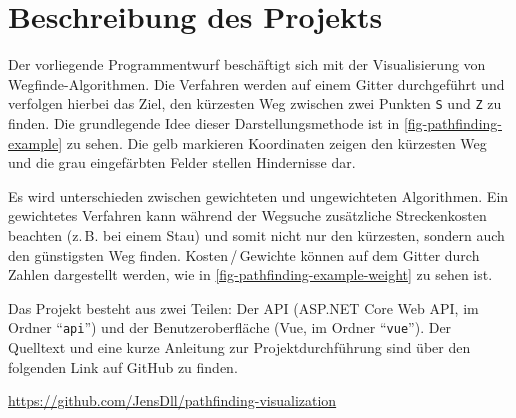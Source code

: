 \part{Beschreibung des Projekts}
Der vorliegende Programmentwurf beschäftigt sich mit der
Visualisierung von Wegfinde-Algo\-rithmen.
Die Verfahren werden auf einem Gitter durchgeführt und
verfolgen hierbei das Ziel, den kürzesten Weg zwischen zwei Punkten
\texttt{S} und \texttt{Z} zu finden.
Die grundlegende Idee dieser Darstellungsmethode ist in
\autoref{fig-pathfinding-example} zu sehen.
Die gelb markieren Koordinaten zeigen den kürzesten Weg und die
grau eingefärbten Felder stellen Hindernisse dar.



\noindent
Es wird unterschieden zwischen gewichteten und ungewichteten
Algorithmen. Ein gewichtetes Verfahren kann während der Wegsuche zusätzliche
Streckenkosten beachten (z.\,B. bei einem Stau)
und somit nicht nur den kürzesten, sondern
auch den günstigsten Weg finden. Kosten\,/\,Gewichte können auf dem Gitter durch
Zahlen dargestellt werden, wie in \autoref{fig-pathfinding-example-weight}
zu sehen ist.



\noindent
Das Projekt besteht aus zwei Teilen: Der API
(ASP.NET Core Web API, im Ordner \enquote{\texttt{api}}) und der Benutzeroberfläche
(Vue, im Ordner \enquote{\texttt{vue}}). Der Quelltext
und eine kurze Anleitung zur Projektdurchführung sind über den folgenden Link auf GitHub zu finden.
\begin{center}
  \url{https://github.com/JensDll/pathfinding-visualization}
\end{center}
